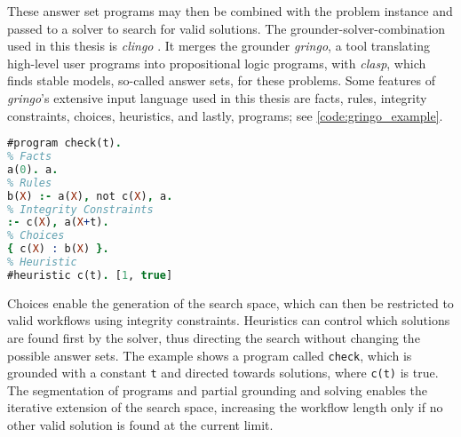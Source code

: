These answer set programs may then be combined with the problem instance and passed to a solver to search for valid solutions. The grounder-solver-combination used in this thesis is \textit{clingo} \cite{gebser2008user}. It merges the grounder \textit{gringo}, a tool translating high-level user programs into propositional logic programs, with \textit{clasp}, which finds stable models, so-called answer sets, for these problems. Some features of \textit{gringo}'s extensive input language used in this thesis are facts, rules, integrity constraints, choices, heuristics, and lastly, programs; see \autoref{code:gringo_example}.
\resetJsonFlag
\begin{lstlisting}[language=Prolog, caption=gringo Input Language Examples., label=code:gringo_example]
#program check(t).
% Facts
a(0). a.
% Rules
b(X) :- a(X), not c(X), a.
% Integrity Constraints
:- c(X), a(X+t).
% Choices
{ c(X) : b(X) }.
% Heuristic
#heuristic c(t). [1, true]
\end{lstlisting}
Choices enable the generation of the search space, which can then be restricted to valid workflows using integrity constraints. Heuristics can control which solutions are found first by the solver, thus directing the search without changing the possible answer sets. The example shows a program called \texttt{check}, which is grounded with a constant \texttt{t} and directed towards solutions, where \texttt{c(t)} is true. The segmentation of programs and partial grounding and solving enables the iterative extension of the search space, increasing the workflow length only if no other valid solution is found at the current limit.
